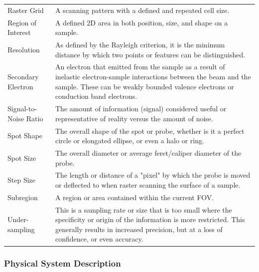 \documentclass[12pt]{article}
\begin{document}
\begin{center}
\begin{longtable}{p{4.25cm} p{11.25cm}}
        Raster Grid & A scanning pattern with a defined and repeated cell size. \\
        
        Region of Interest & A defined 2D area in both position, size, and shape on a sample. \\
        
        Resolution & As defined by the Rayleigh criterion, it is the minimum distance by which two points or features can be distinguished. \\
        
        Secondary Electron & An electron that emitted from the sample as a result of inelastic electron-sample interactions between the beam and the sample. These can be weakly bounded valence electrons or conduction band electrons. \\
        
        Signal-to-Noise Ratio & The amount of information (signal) considered useful or representative of reality versus the amount of noise. \\
        
        Spot Shape & The overall shape of the spot or probe, whether is it a perfect circle or elongated ellipse, or even a halo or ring. \\
        
        Spot Size & The overall diameter or average feret/caliper diameter of the probe. \\
        
        Step Size & The length or distance of a "pixel" by which the probe is moved or deflected to when raster scanning the surface of a sample. \\
        
        Subregion & A region or area contained within the current FOV. \\

        Under-sampling & This is a sampling rate or size that is too small where the specificity or origin of the information is more restricted. This generally results in increased precision, but at a loss of confidence, or even accuracy. \\
        \bottomrule
    \end{longtable} 
\end{center}

\newpage

\subsubsection{Physical System Description} \label{sec_phySystDescrip}
\end{document}
